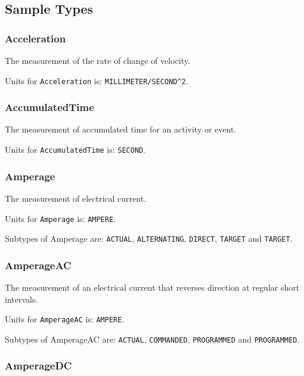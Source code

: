 \subsection{Sample Types} \label{sec:SampleTypes}

\subsubsection{Acceleration}
  \label{sec:Acceleration}


The measurement of the rate of change of velocity.


Units for \texttt{Acceleration} is: \texttt{MILLIMETER/SECOND\^{}2}.

\FloatBarrier

\subsubsection{AccumulatedTime}
  \label{sec:AccumulatedTime}


The measurement of accumulated time for an activity or event.


Units for \texttt{AccumulatedTime} is: \texttt{SECOND}.

\FloatBarrier

\subsubsection{Amperage}
  \label{sec:Amperage}


The measurement of electrical current.


Units for \texttt{Amperage} is: \texttt{AMPERE}.


Subtypes of Amperage are: \texttt{ACTUAL}, \texttt{ALTERNATING}, \texttt{DIRECT}, \texttt{TARGET} and \texttt{TARGET}. 
\FloatBarrier

\subsubsection{AmperageAC}
  \label{sec:AmperageAC}


The measurement of an electrical current that reverses direction at regular short intervals.


Units for \texttt{AmperageAC} is: \texttt{AMPERE}.


Subtypes of AmperageAC are: \texttt{ACTUAL}, \texttt{COMMANDED}, \texttt{PROGRAMMED} and \texttt{PROGRAMMED}. 
\FloatBarrier

\subsubsection{AmperageDC}
  \label{sec:AmperageDC}


